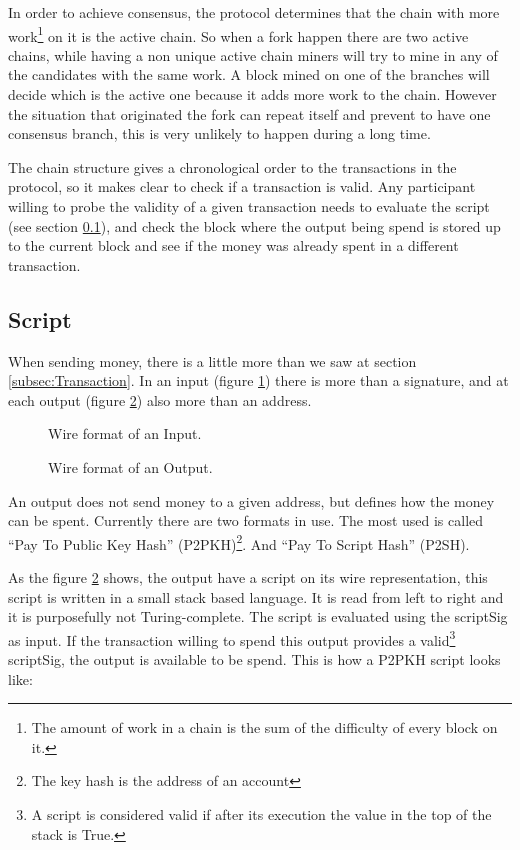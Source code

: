 In order to achieve consensus, the protocol determines that the chain with
  more work\footnote{The amount of work in a chain is the sum of the difficulty
  of every block on it.} on it is the active chain.
So when a fork happen there are two active chains, while having a non unique
  active chain miners will try to mine in any of the candidates with the same
  work.
A block mined on one of the branches will decide which is the active one
  because it adds more work to the chain. However the situation that originated
  the fork can repeat itself and prevent to have one consensus branch, this is
  very unlikely\cite{decker2013information} to happen during a long time.

The chain structure gives a chronological order to the transactions in the
  protocol, so it makes clear to check if a transaction is valid.
Any participant willing to probe the validity of a given transaction needs
  to evaluate the script (see section \ref{subsec:script}), and  check the block
  where the output being spend is stored up to the current block and see if the
  money was already spent in a different transaction.

  \subsection{Script} \label{subsec:script}

When sending money, there is a little more than we saw at section
  \ref{subsec:Transaction}. In an input (figure \ref{fig:input}) there is more
  than a signature, and at each output (figure \ref{fig:output}) also more than
  an address.

  \begin{figure}[ht]
	\centering
	
	\caption{Wire format of an Input.}
	\label{fig:input}
\end{figure}

\begin{figure}[ht]
	\centering
	
	\caption{Wire format of an Output.}
	\label{fig:output}
\end{figure}

An output does not send money to a given address, but defines how the money can
  be spent. Currently there are two formats in use. The most used is called
  ``Pay To Public Key Hash'' (P2PKH)\footnote{The key hash is the address of an
  account}. And ``Pay To Script Hash'' (P2SH).

As the figure \ref{fig:output} shows, the output have a script on its wire
  representation, this script is written in a small stack based language.
It is read from left to right and it is purposefully not Turing-complete.
The script is evaluated using the scriptSig as input. If the transaction willing
  to spend this output provides a valid\footnote{A script is considered valid
  if after its execution the value in the top of the stack is True.} scriptSig,
  the output is available to be spend. This is how a P2PKH script looks like:

